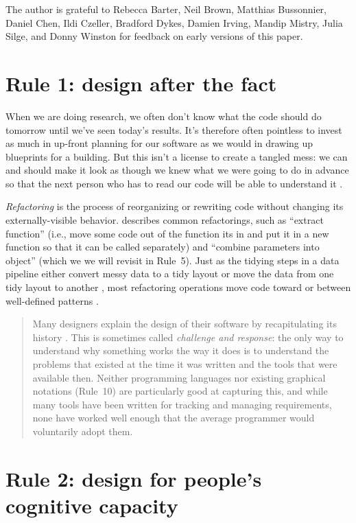 \documentclass[10pt,letterpaper]{article}
\begin{document}
The author is grateful to Rebecca Barter,
Neil Brown,
Matthias Bussonnier,
Daniel Chen,
Ildi Czeller,
Bradford Dykes,
Damien Irving,
Mandip Mistry,
Julia Silge,
and Donny Winston
for feedback on early versions of this paper.

\section*{Rule 1: design after the fact}

When we are doing research,
we often don't know what the code should do tomorrow
until we've seen today's results.
It's therefore often pointless to invest as much in up-front planning for our software
as we would in drawing up blueprints for a building.
But this isn't a license to create a tangled mess:
we can and should make it look as though we knew what we were going to do in advance
so that the next person who has to read our code will be able to understand it \cite{Parnas1986}.

\emph{Refactoring} is the process of reorganizing or rewriting code
without changing its externally-visible behavior.
\cite{Fowler2018} describes common refactorings,
such as ``extract function''
(i.e., move some code out of the function its in
and put it in a new function so that it can be called separately)
and ``combine parameters into object''
(which we we will revisit in Rule~5).
Just as the tidying steps in a data pipeline
either convert messy data to a tidy layout or move the data from one tidy layout to another \cite{Wickham2017},
most refactoring operations move code toward or between well-defined patterns \cite{Kerievsky2004}.

\begin{quotation}
  \noindent
  Many designers explain the design of their software
  by recapitulating its history \cite{Brown2011,Brown2012}.
  This is sometimes called \emph{challenge and response}:
  the only way to understand why something works the way it does
  is to understand the problems that existed at the time it was written
  and the tools that were available then.
  Neither programming languages nor existing graphical notations (Rule~10)
  are particularly good at capturing this,
  and while many tools have been written for tracking and managing requirements,
  none have worked well enough that the average programmer would voluntarily adopt them.
\end{quotation}

\section*{Rule 2: design for people's cognitive capacity}
\end{document}
